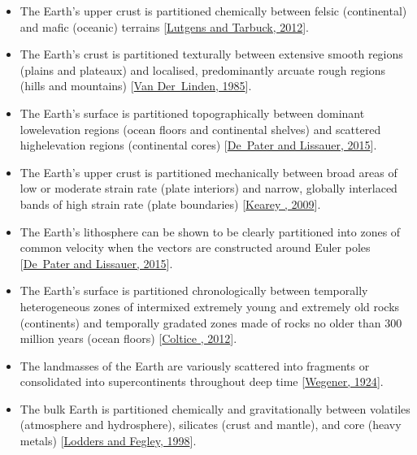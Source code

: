 \documentclass[letterpaper,10pt,english]{jupyterBook}
\begin{document}
\begin{itemize}
\item {} 
\sphinxAtStartPar
The Earth’s upper crust is partitioned chemically between felsic (continental) and mafic (oceanic) terrains {[}\hyperlink{cite.references:id504}{Lutgens and Tarbuck, 2012}{]}.

\item {} 
\sphinxAtStartPar
The Earth’s crust is partitioned texturally between extensive smooth regions (plains and plateaux) and localised, predominantly arcuate rough regions (hills and mountains) {[}\hyperlink{cite.references:id505}{Van Der Linden, 1985}{]}.

\item {} 
\sphinxAtStartPar
The Earth’s surface is partitioned topographically between dominant low\sphinxhyphen{}elevation regions (ocean floors and continental shelves) and scattered high\sphinxhyphen{}elevation regions (continental cores) {[}\hyperlink{cite.references:id503}{De Pater and Lissauer, 2015}{]}.

\item {} 
\sphinxAtStartPar
The Earth’s upper crust is partitioned mechanically between broad areas of low or moderate strain rate (plate interiors) and narrow, globally interlaced bands of high strain rate (plate boundaries) {[}\hyperlink{cite.references:id502}{Kearey , 2009}{]}.

\item {} 
\sphinxAtStartPar
The Earth’s lithosphere can be shown to be clearly partitioned into zones of common velocity when the vectors are constructed around Euler poles {[}\hyperlink{cite.references:id503}{De Pater and Lissauer, 2015}{]}.

\item {} 
\sphinxAtStartPar
The Earth’s surface is partitioned chronologically between temporally heterogeneous zones of intermixed extremely young and extremely old rocks (continents) and temporally gradated zones made of rocks no older than 300 million years (ocean floors) {[}\hyperlink{cite.references:id507}{Coltice , 2012}{]}.

\item {} 
\sphinxAtStartPar
The landmasses of the Earth are variously scattered into fragments or consolidated into supercontinents throughout deep time {[}\hyperlink{cite.references:id506}{Wegener, 1924}{]}.

\item {} 
\sphinxAtStartPar
The bulk Earth is partitioned chemically and gravitationally between volatiles (atmosphere and hydrosphere), silicates (crust and mantle), and core (heavy metals) {[}\hyperlink{cite.references:id292}{Lodders and Fegley, 1998}{]}.


\end{itemize}
\end{document}
